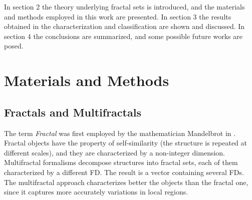 In section 2 the theory underlying fractal sets is introduced, and the materials and methods employed in this work are presented. In section 3 the results obtained in the characterization and classification  are shown and discussed. In section 4 the conclusions are summarized, and some possible future works are posed.


\section{Materials and Methods}
\label{sec:1}
\subsection{Fractals and Multifractals}
\label{sec:2}

The term {\em Fractal} was first employed by the mathematician Mandelbrot in \cite{Mandelbrot83}. Fractal objects have the property of self-similarity (the structure is repeated at different scales), and they are characterized by a non-integer dimension. Multifractal formalisms decompose structures into fractal sets, each of them characterized by a different FD. The result is a vector containing several FDs. The multifractal approach characterizes better the objects than the fractal one, since it captures more accurately variations in local regions.


